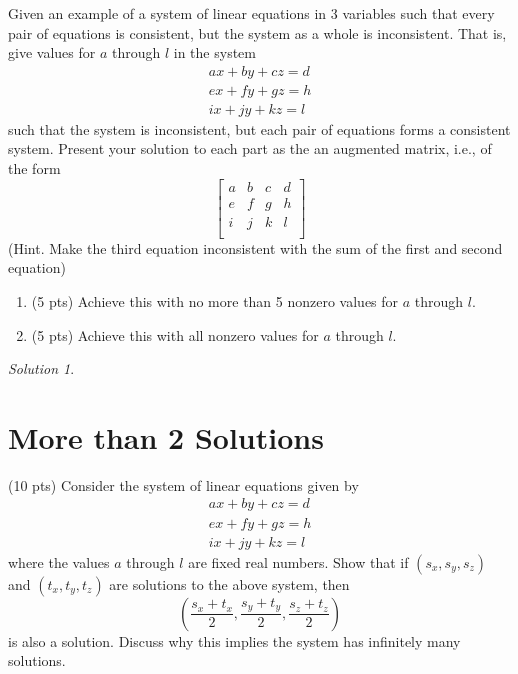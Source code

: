 \documentclass{article}
\theoremstyle{remark}
\newtheorem*{solution}{Solution}
\begin{document}
Given an example of a system of linear equations in 3 variables such that every pair of equations is consistent, but the system as a whole is inconsistent. That is, give values for $a$ through $l$ in the system
\begin{align*}
  ax + by + cz = d \\
  ex + fy + gz = h \\
  ix + jy + kz = l
\end{align*}
such that the system is inconsistent, but each pair of equations forms a consistent system. Present your solution to each part as the an augmented matrix, i.e., of the form
\begin{displaymath}
  \begin{bmatrix}
    a & b & c & d \\
    e & f & g & h \\
    i & j & k & l \\
  \end{bmatrix}
\end{displaymath}
(Hint. Make the third equation inconsistent with the sum of the first and second equation)
\begin{enumerate}
\item (5 pts) Achieve this with no more than 5 nonzero values for $a$ through $l$.
\item (5 pts) Achieve this with all nonzero values for $a$ through $l$.
\end{enumerate}

\begin{solution}
\end{solution}

\pagebreak
\section{More than 2 Solutions}

(10 pts) Consider the system of linear equations given by
\begin{align*}
  ax + by + cz = d \\
  ex + fy + gz = h \\
  ix + jy + kz = l
\end{align*}
where the values $a$ through $l$ are fixed real numbers.
Show that if $(s_x, s_y, s_z)$ and $(t_x, t_y, t_z)$ are solutions to the above system, then
\begin{displaymath}
  \left(\frac{s_x + t_x}{2}, \frac{s_y + t_y}{2}, \frac{s_z + t_z}{2} \right)
\end{displaymath}
is also a solution.
Discuss why this implies the system has infinitely many solutions.
\end{document}
